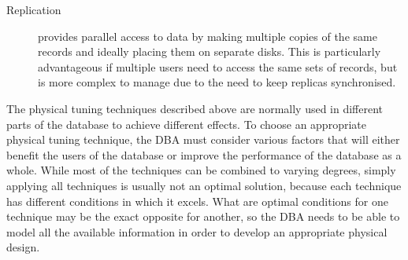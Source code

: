 \documentclass{llncs}
\begin{document}
\begin{description}
% 


	\item[Replication] provides parallel access to data by making
	multiple copies of the same records and ideally placing them on
	separate disks. This is particularly advantageous if multiple users
	need to access the same sets of records, but is more complex to
	manage due to the need to keep replicas synchronised.


\end{description}



The physical tuning techniques described above are normally used in
different parts of the database to achieve different effects. To choose
an appropriate physical tuning technique, the DBA must consider various
factors that will either benefit the users of the database or improve
the performance of the database as a whole. While most of the techniques
can be combined to varying degrees, simply applying all techniques is
usually not an optimal solution, because each technique has different
conditions in which it excels. What are optimal conditions for one
technique may be the exact opposite for another, so the DBA needs to be
able to model all the available information in order to develop an
appropriate physical design.
\end{document}
